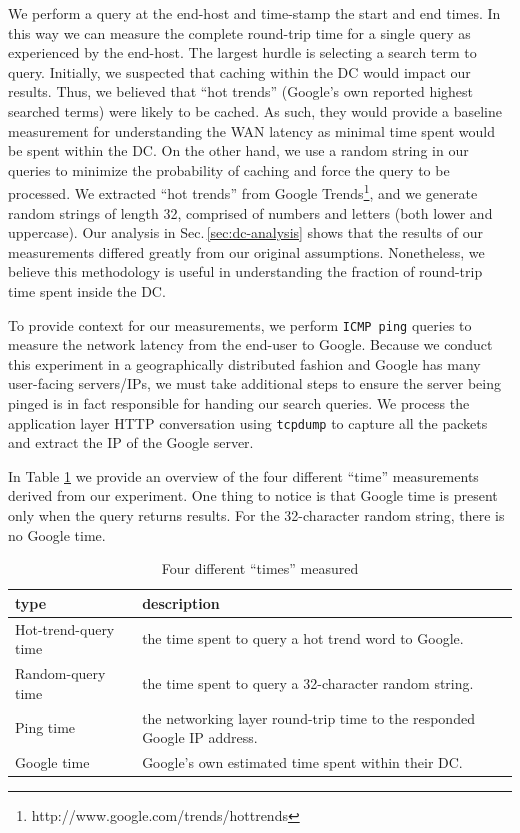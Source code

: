 We perform a query at the end-host and time-stamp the start and end times. In this way we can measure the complete round-trip time for a single query as experienced by the end-host. The largest hurdle is selecting a search term to query. Initially, we suspected that caching within the DC would impact our results. Thus, we believed that ``hot trends'' (Google's own reported highest searched terms) were likely to be cached. As such, they would provide a baseline measurement for understanding the WAN latency as minimal time spent would be spent within the DC. On the other hand, we use a random string in our queries to minimize the probability of caching and force the query to be processed. We extracted ``hot trends'' from Google Trends\footnote{http://www.google.com/trends/hottrends}, and we generate random strings of length 32, comprised of numbers and letters (both lower and uppercase). Our analysis in Sec.\,\ref{sec:dc-analysis} shows that the results of our measurements differed greatly from our original assumptions. Nonetheless, we believe this methodology is useful in understanding the fraction of round-trip time spent inside the DC.

To provide context for our measurements, we perform \texttt{ICMP ping} queries to measure the network latency from the end-user to Google. Because we conduct this experiment in a geographically distributed fashion and Google has many user-facing servers/IPs, we must take additional steps to ensure the server being pinged is in fact responsible for handing our search queries. We process the application layer HTTP conversation using \texttt{tcpdump} to capture all the packets and extract the IP of the Google server.
 
In Table \ref{tab:DC_method} we provide an overview of the four different ``time'' measurements derived from our experiment. One thing to notice is that Google time is present only when the query returns results. For the 32-character random string, there is no Google time.

\begin{table}
  \begin{tabular}{p{2.3cm} | p{5.5cm}}
    \hline
    type & description \\
    \hline
    Hot-trend-query time & the time spent to query a hot trend word to Google. \\
    \hline
    Random-query time & the time spent to query a 32-character random string.  \\
    \hline
    Ping time & the networking layer round-trip time to the responded Google IP address. \\
    \hline
    Google time & Google's own estimated time spent within their DC. \\
    \hline
  \end{tabular}
  \vspace{1em}
  \caption{Four different ``times'' measured}
  \label{tab:DC_method}
\end{table}


